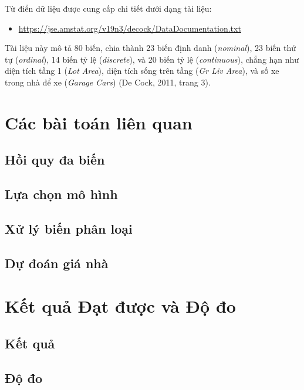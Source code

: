 \documentclass{article}
\begin{document}
Từ điển dữ liệu được cung cấp chi tiết dưới dạng tài liệu:

\begin{itemize}[label=$\bullet$]
    \item \href{https://jse.amstat.org/v19n3/decock/DataDocumentation.txt}{https://jse.amstat.org/v19n3/decock/DataDocumentation.txt}
\end{itemize}

Tài liệu này mô tả 80 biến, chia thành 23 biến định danh (\textit{nominal}), 23 biến thứ tự (\textit{ordinal}), 14 biến tỷ lệ (\textit{discrete}), và 20 biến tỷ lệ (\textit{continuous}), chẳng hạn như diện tích tầng 1 (\textit{Lot Area}), diện tích sống trên tầng (\textit{Gr Liv Area}), và số xe trong nhà để xe (\textit{Garage Cars}) (De Cock, 2011, trang 3).

\section{Các bài toán liên quan}

\subsection{Hồi quy đa biến}

\subsection{Lựa chọn mô hình}

\subsection{Xử lý biến phân loại}

\subsection{Dự đoán giá nhà}


\section{Kết quả Đạt được và Độ đo}
\subsection{Kết quả}

\subsection{Độ đo}

\end{document}
